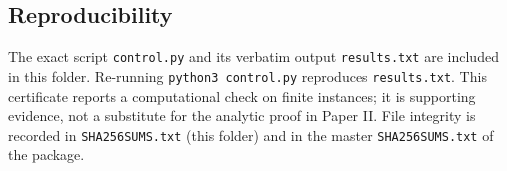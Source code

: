 \documentclass[11pt]{article}
\begin{document}
\subsection*{Reproducibility}
The exact script \texttt{control.py} and its verbatim output \texttt{results.txt} are included in this
folder. Re-running \texttt{python3 control.py} reproduces \texttt{results.txt}. This certificate reports a
computational check on finite instances; it is supporting evidence, not a substitute for the analytic
proof in Paper II. File integrity is recorded in \texttt{SHA256SUMS.txt} (this folder) and in the master
\texttt{SHA256SUMS.txt} of the package.
\end{document}
